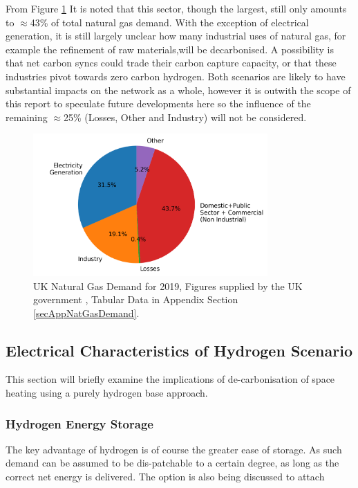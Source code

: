 \documentclass[11pt]{article}
\numberwithin{equation}{section}
\begin{document}
From Figure \ref{figNatualGassDemandBreakdown} It is noted that this sector, though the largest, still only amounts to \(\approx\)43\% of total natural gas demand. With the exception of electrical generation, it is still largely unclear how many industrial uses of natural gas, for example the refinement of raw materials,will be decarbonised. A possibility is that net carbon syncs could trade their carbon capture capacity, or that these industries pivot towards zero carbon hydrogen. Both scenarios are likely to have substantial impacts on the network as a whole, however it is outwith the scope of this report to speculate future developments here so the influence of the remaining \(\approx\)25\% (Losses, Other and Industry) will not be considered.

\begin{figure}[H]
\centering
\includegraphics[width=0.8\textwidth]{./.ob-jupyter/059e5607973df26cf3fa1f5f9cae00619ccdfac7.png}
\caption{\label{figNatualGassDemandBreakdown}UK Natural Gas Demand for 2019, Figures supplied by the UK government \cite{NaturalGas}, Tabular Data in Appendix Section \ref{secAppNatGasDemand}.}
\end{figure}

\subsection{Electrical Characteristics of Hydrogen Scenario}
\label{sec:orga63f4e0}
This section will briefly examine the implications of de-carbonisation of space heating using a purely hydrogen base approach.

\subsubsection{Hydrogen Energy Storage}
\label{sec:org90f671b}
The key advantage of hydrogen is of course the greater ease of storage\cite{HydrogenEnergyStorag2}. As such demand can be assumed to be dis-patchable to a certain degree, as long as the correct net energy is delivered. The option is also being discussed to attach
\end{document}
